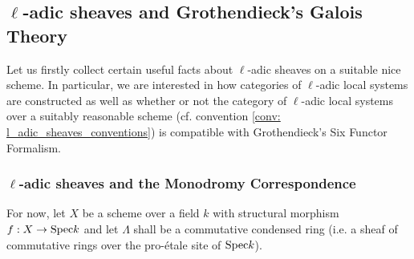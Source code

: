    \subsection{\texorpdfstring{$\ell$}{}-adic sheaves and Grothendieck's Galois Theory}
        Let us firstly collect certain useful facts about $\ell$-adic sheaves on a suitable nice scheme. In particular, we are interested in how categories of $\ell$-adic local systems are constructed as well as whether or not the category of $\ell$-adic local systems over a suitably reasonable scheme (cf. convention \ref{conv: l_adic_sheaves_conventions}) is compatible with Grothendieck's Six Functor Formalism.
        
        \subsubsection{\texorpdfstring{$\ell$}{}-adic sheaves and the Monodromy Correspondence}
            \begin{convention} \label{conv: condensed_coefficient_ring_for_adic_sheaves}
                For now, let $X$ be a scheme over a field $k$ with structural morphism $f: X \to \mathrm{Spec} k$ and let $\Lambda$ shall be a commutative condensed ring (i.e. a sheaf of commutative rings over the pro-\'etale site of $\mathrm{Spec} k$). 
            \end{convention}